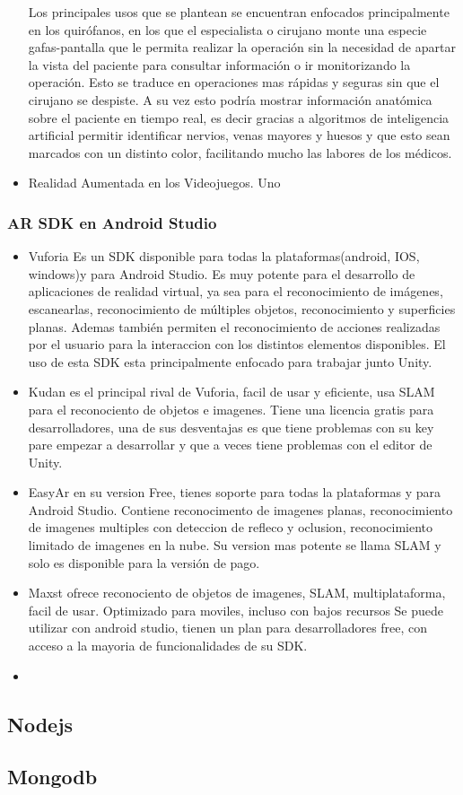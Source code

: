 \begin{itemize}
	Los principales usos que se plantean se encuentran enfocados principalmente en los quirófanos, en los que el especialista o cirujano monte una especie gafas-pantalla que le permita realizar la operación sin la necesidad de apartar la vista del paciente para consultar información o ir monitorizando la operación. Esto se traduce en operaciones mas rápidas y seguras sin que el cirujano se despiste. A su vez esto podría mostrar información anatómica sobre el paciente en tiempo real,  es decir gracias a algoritmos de inteligencia artificial permitir identificar nervios, venas mayores y huesos y que esto sean marcados con un distinto color, facilitando mucho las labores de los médicos.

	\item Realidad Aumentada en los Videojuegos. Uno

\end{itemize}


\subsubsection{AR SDK en Android Studio}

\begin{itemize}

	\item Vuforia Es un SDK disponible para todas la plataformas(android, IOS, windows)y para Android Studio. Es muy potente para el desarrollo de aplicaciones de realidad virtual, ya sea para el reconocimiento de imágenes, escanearlas, reconocimiento de múltiples objetos, reconocimiento y superficies planas. Ademas también permiten el reconocimiento de acciones realizadas por el usuario para la interaccion con los distintos elementos disponibles. El uso de esta SDK esta principalmente enfocado para trabajar junto Unity.

	\item Kudan es el principal rival de Vuforia, facil de usar y eficiente, usa SLAM para el reconociento de objetos e imagenes. Tiene una licencia gratis para desarrolladores, una de sus desventajas es que tiene problemas con su key pare empezar a desarrollar y que a veces tiene problemas con el editor de Unity.

	\item EasyAr en su version Free, tienes soporte para todas la plataformas y para Android Studio. Contiene reconocimento de imagenes planas, reconocimiento de imagenes multiples con deteccion de refleco y oclusion, reconocimiento limitado de imagenes en la nube. Su version mas potente se llama SLAM y solo es disponible para la versión de pago.

	\item Maxst ofrece reconociento de objetos de imagenes, SLAM, multiplataforma, facil de usar. Optimizado para moviles, incluso con bajos recursos Se puede utilizar con android studio, tienen un plan para desarrolladores free, con acceso a la mayoria de funcionalidades de su SDK.
	\item 
\end{itemize}

\subsection{Nodejs}
\subsection{Mongodb}
